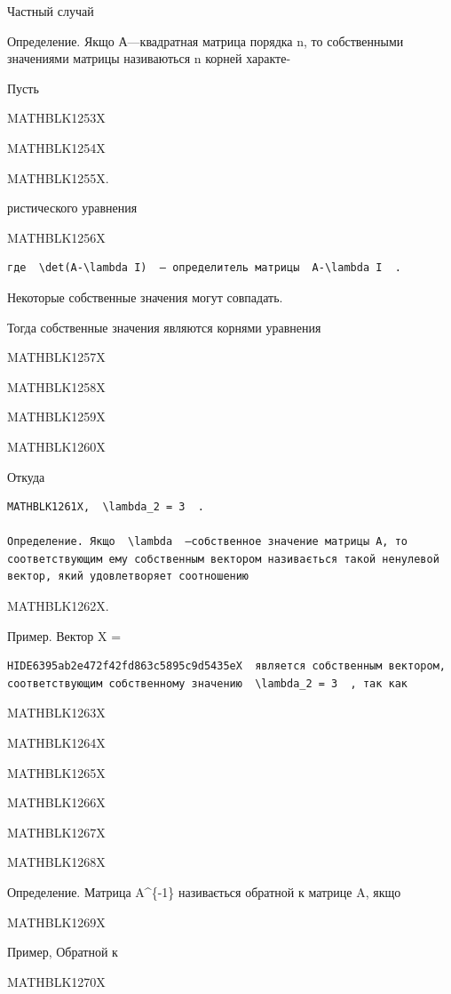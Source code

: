 \documentclass[
  ukrainian,
]{article}
\begin{document}
Частный случай

Определение. Якщо А---квадратная матрица порядка n, то собственными
значениями матрицы називаються n корней характе-

Пусть

MATHBLK1253X

MATHBLK1254X

MATHBLK1255X.

ристического уравнения

MATHBLK1256X

\begin{verbatim}
где  \det(A-\lambda I)  — определитель матрицы  A-\lambda I  .
\end{verbatim}

Некоторые собственные значения могут совпадать.

Тогда собственные значения являются корнями уравнения

MATHBLK1257X

MATHBLK1258X

MATHBLK1259X

MATHBLK1260X

Откуда

\begin{verbatim}
MATHBLK1261X,  \lambda_2 = 3  .

Определение. Якщо  \lambda  —собственное значение матрицы A, то соответствующим ему собственным вектором називається такой ненулевой вектор, який удовлетворяет соотношению
\end{verbatim}

MATHBLK1262X.

Пример. Вектор X =

\begin{verbatim}
HIDE6395ab2e472f42fd863c5895c9d5435eX  является собственным вектором, соответствующим собственному значению  \lambda_2 = 3  , так как
\end{verbatim}

MATHBLK1263X

MATHBLK1264X

MATHBLK1265X

MATHBLK1266X

MATHBLK1267X

MATHBLK1268X

Определение. Матрица A\^{}\{-1\} називається обратной к матрице A, якщо

MATHBLK1269X

Пример, Обратной к

MATHBLK1270X
\end{document}
